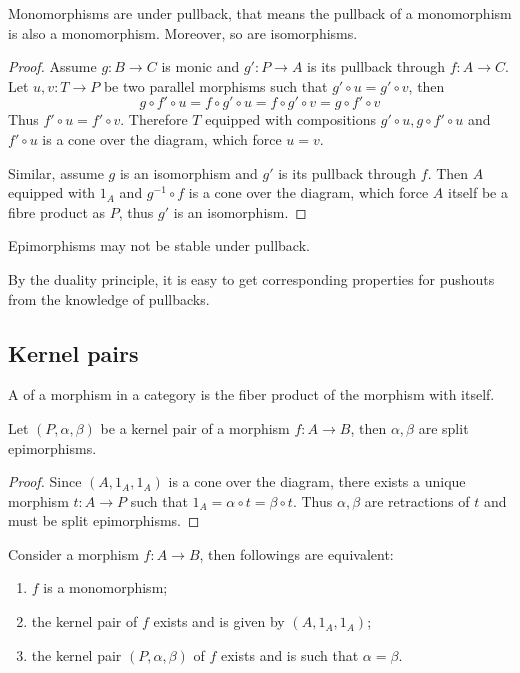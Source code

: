   \begin{prop}
    Monomorphisms are  under pullback, that means the pullback of a monomorphism is also a monomorphism. Moreover, so are isomorphisms.
  \end{prop}
  \begin{proof}
    Assume $g\colon B\to C$ is monic and $g'\colon P\to A$ is its pullback through $f\colon A\to C$. Let $u,v\colon T\to P$ be two parallel morphisms such that $g'\circ u=g'\circ v$, then
    \begin{equation*}
      g\circ f'\circ u = f\circ g'\circ u = f\circ g'\circ v = g\circ f'\circ v
    \end{equation*}
    Thus $f'\circ u=f'\circ v$. Therefore $T$ equipped with compositions $g'\circ u, g\circ f'\circ u$ and $f'\circ u$ is a cone over the diagram, which force $u=v$.

    Similar, assume $g$ is an isomorphism and $g'$ is its pullback through $f$. Then $A$ equipped with $1_A$ and $g^{-1}\circ f$ is a cone over the diagram, which force $A$ itself be a fibre product as $P$, thus $g'$ is an isomorphism.
  \end{proof}
  \begin{rem}
    Epimorphisms may not be stable under pullback.
  \end{rem}


  By the duality principle, it is easy to get corresponding properties for pushouts from the knowledge of pullbacks.

\subsection{Kernel pairs}
  \begin{defn}
    A  of a morphism in a category is the fiber product of the morphism with itself.
  \end{defn}
  \begin{prop}
    Let $(P,\alpha,\beta)$ be a kernel pair of a morphism $f\colon A\to B$, then $\alpha,\beta$ are split epimorphisms.
  \end{prop}
  \begin{proof}
    Since $(A,1_A,1_A)$ is a cone over the diagram, there exists a unique morphism $t\colon A\to P$ such that $1_A=\alpha\circ t=\beta\circ t$. Thus $\alpha,\beta$ are retractions of $t$ and must be split epimorphisms.
  \end{proof}
  \begin{prop}\label{prop:mono and kernel pair}
    Consider a morphism $f\colon A\to B$, then followings are equivalent:
    \begin{enumerate}
      \item $f$ is a monomorphism;
      \item the kernel pair of $f$ exists and is given by $(A, 1_A, 1_A)$;
      \item the kernel pair $(P, \alpha, \beta)$ of $f$ exists and is such that $\alpha=\beta$.
    \end{enumerate}
  \end{prop}

